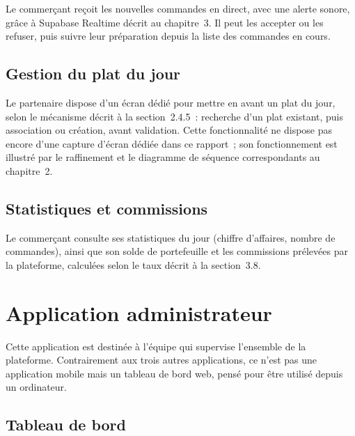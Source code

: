 \documentclass[12pt,fleqn,a4paper]{report}
\begin{document}
\begin{justify}
Le commerçant reçoit les nouvelles commandes en direct, avec une alerte sonore, grâce à Supabase Realtime décrit au chapitre~3. Il peut les accepter ou les refuser, puis suivre leur préparation depuis la liste des commandes en cours.

\subsection{Gestion du plat du jour}

Le partenaire dispose d'un écran dédié pour mettre en avant un plat du jour, selon le mécanisme décrit à la section~2.4.5~: recherche d'un plat existant, puis association ou création, avant validation. Cette fonctionnalité ne dispose pas encore d'une capture d'écran dédiée dans ce rapport~; son fonctionnement est illustré par le raffinement et le diagramme de séquence correspondants au chapitre~2.

\subsection{Statistiques et commissions}


Le commerçant consulte ses statistiques du jour (chiffre d'affaires, nombre de commandes), ainsi que son solde de portefeuille et les commissions prélevées par la plateforme, calculées selon le taux décrit à la section~3.8.

\section{Application administrateur}

Cette application est destinée à l'équipe qui supervise l'ensemble de la plateforme. Contrairement aux trois autres applications, ce n'est pas une application mobile mais un tableau de bord web, pensé pour être utilisé depuis un ordinateur.

\subsection{Tableau de bord}


\end{justify}
\end{document}
